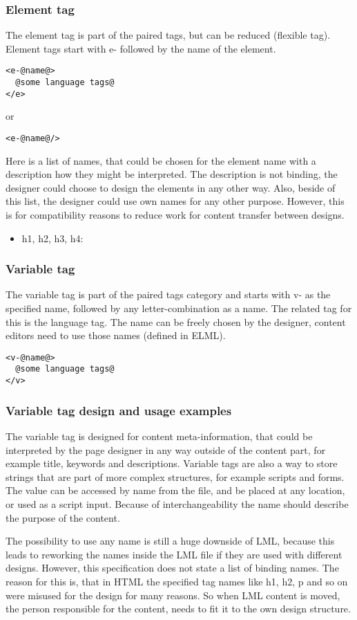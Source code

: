 \documentclass[12pt,a4paper]{article}
\begin{document}
\subsubsection*{Element tag}
The element tag is part of the paired tags, but can be reduced (flexible tag). Element tags start with e- followed by the name of the element.
\begin{lstlisting}[frame=single,style=base]
<e-@name@>
  @some language tags@
</e>
\end{lstlisting}
or
\begin{lstlisting}[frame=single,style=base]
<e-@name@/>
\end{lstlisting}

Here is a list of names, that could be chosen for the element name with a description how they might be interpreted. The description is not binding, the designer could choose to design the elements in any other way. Also, beside of this list, the designer could use own names for any other purpose. However, this is for compatibility reasons to reduce work for content transfer between designs.

\begin{itemize}
\item h1, h2, h3, h4:
\end{itemize}
\subsubsection*{Variable tag}
The variable tag is part of the paired tags category and starts with v- as the specified name, followed by any letter-combination as a name. The related tag for this is the language tag. The name can be freely chosen by the designer, content editors need to use those names (defined in ELML).
\begin{lstlisting}[frame=single,style=base]
<v-@name@>
  @some language tags@
</v>
\end{lstlisting}
\begin{tcolorbox}[parbox=false]
\subsubsection*{Variable tag design and usage examples}
The variable tag is designed for content meta-information, that could be interpreted by the page designer in any way outside of the content part, for example title, keywords and descriptions. Variable tags are also a way to store strings that are part of more complex structures, for example scripts and forms. The value can be accessed by name from the file, and be placed at any location, or used as a script input. Because of interchangeability the name should describe the purpose of the content.

The possibility to use any name is still a huge downside of LML, because this leads to reworking the names inside the LML file if they are used with different designs. However, this specification does not state a list of binding names. The reason for this is, that in HTML the specified tag names like h1, h2, p and so on were misused for the design for many reasons. So when LML content is moved, the person responsible for the content, needs to fit it to the own design structure.
\end{tcolorbox}
\end{document}
